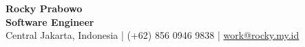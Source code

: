 \newcommand{\headertitlesoftware}{Software Engineer}
\newcommand{\headertitlebackend}{Software Engineer -- Backend Specialist}

\begin{center}
	{\Large \textbf{Rocky Prabowo}}\\
	\vspace{1pt}
	\textbf{
		{}
		{\headertitlesoftware}
	}\\
	\vspace{1pt}
	Central Jakarta, Indonesia \;|\; (+62) 856 0946 9838 \;|\; \href{mailto:work@rocky.my.id}{work@rocky.my.id}
\end{center}
